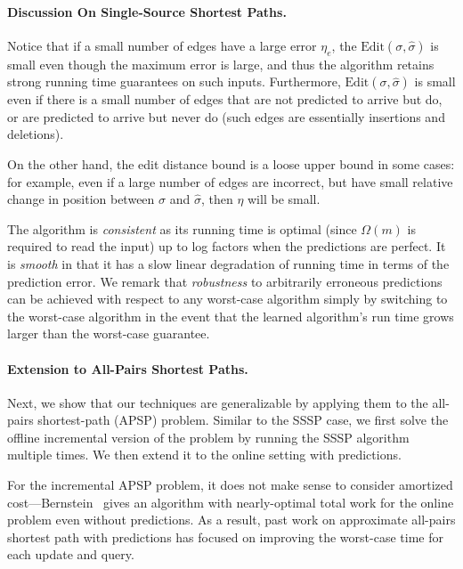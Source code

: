 \paragraph{Discussion On Single-Source Shortest Paths.}   Notice that if a small number of edges have a large error $\eta_e$, the $\text{Edit}(\sigma,\hat{\sigma})$ is small even though the maximum error is large, and thus the algorithm retains strong running time guarantees on such inputs.   
Furthermore, $\text{Edit}(\sigma,\hat{\sigma})$ is small even if there is a small number of edges that are not predicted to arrive but do, or are predicted to arrive but never do (such edges are essentially insertions and deletions).  

On the other hand, the edit distance bound is a loose upper bound in some cases: for example, even if a large number of edges are incorrect, but have small relative change in position between $\sigma$ and $\hat{\sigma}$, then $\eta$ will be small. 

The algorithm is \emph{consistent} as its running time is optimal (since $\Omega(m)$ is required to read the input) up to log factors when the predictions are perfect.
It is \emph{smooth} in that it has a slow linear degradation of running time in terms of the prediction error.  We remark that \emph{robustness} to arbitrarily erroneous predictions can be achieved with respect to any worst-case algorithm simply by switching to the worst-case algorithm in the event that the learned algorithm's run time grows larger than the worst-case guarantee. 

\paragraph{Extension to All-Pairs  Shortest Paths.}  Next, we show that our techniques are generalizable by applying them to the all-pairs shortest-path (APSP) problem.  Similar to the SSSP case, we first solve the offline incremental version of the problem by running the SSSP algorithm multiple times.  We then extend it to the online setting with predictions. 

For the incremental APSP problem, it does not make sense to consider amortized cost---Bernstein~\cite{bernstein2016maintaining} gives an algorithm with nearly-optimal total work for the online problem even without predictions.  As a result, past work on approximate all-pairs shortest path with predictions has focused on improving the worst-case time for each update and query.  

